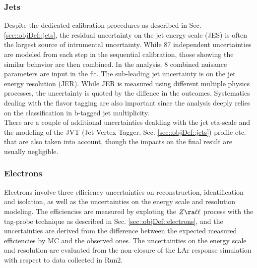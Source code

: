 \subsubsection{Jets} 
Despite the dedicated calibration procedures as described in Sec. \ref{sec::objDef::jets}, the residual uncertainty on the jet energy scale (JES) is often the largest source of intrumental uncertainty. While 87 independent uncertainties are modeled from each step in the sequential calibration,
those showing the similar behavior are then combined. In the analysis, 8 combined nuisance parameters are input in the fit.
The sub-leading jet uncertainty is on the jet energy resolution (JER). While JER is measured using different multiple physics processes, the uncertainty is quoted by the diffence in the outcomes.
Systematics dealing with the flavor tagging are also important since the analysis deeply relies on the classification in b-tagged jet multiplicity. 
\\
There are a couple of additional uncertainties dealding with the jet eta-scale and the modeling of the JVT (Jet Vertex Tagger, Sec. \ref{sec::objDef::jets}) profile etc. that are also taken into account, though the impacts on the final result are usually negligible. \\




\subsubsection{Electrons}
Electrons involve three efficiency uncertainties on reconstruction, identification and isolation, as well as the uncertainties on the energy scale and resolution modeling.
The efficiencies are measured by exploting the $Z\ra\ell\ell$ process with the tag-probe technique as described in Sec. \ref{sec::objDef::electrons}, and the uncertainties are derived from the difference between the expected measured efficiencies by MC and the observed ones.
The uncertainties on the energy scale and resolution are evaluated from the non-closure of the LAr response simulation with respect to data collected in Run2.  \\

